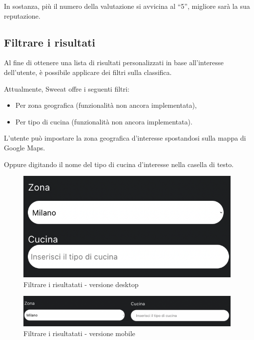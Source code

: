 In sostanza, più il numero della valutazione si avvicina al “5”, migliore sarà la sua reputazione.

\subsection{Filtrare i risultati}

Al fine di ottenere una lista di risultati personalizzati in base all’interesse dell’utente, è possibile applicare dei filtri sulla classifica.

Attualmente, Sweeat offre i seguenti filtri:

\begin{itemize}
\item Per zona geografica (funzionalità non ancora implementata),
\item Per tipo di cucina (funzionalità non ancora implementata).
\end{itemize}

L’utente può impostare la zona geografica d’interesse spostandosi sulla mappa di Google Maps.

Oppure digitando il nome del tipo di cucina d’interesse nella casella di testo.

\begin{figure}[H]
\centering
\includegraphics[scale=0.4]{./images/Ricerca/Filtri.png} 
\caption{Filtrare i risultatati - versione desktop}
\end{figure}

\begin{figure}[H]
\centering
\includegraphics[scale=0.4]{./images/Ricerca/FiltriMobile.png} 
\caption{Filtrare i risultatati - versione mobile}
\end{figure}

